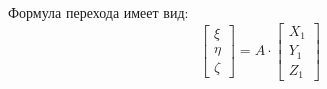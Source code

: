 Формула перехода имеет вид:
\begin{equation}
	\begin{bmatrix}
		\xi \\
		\eta \\
		\zeta
	\end{bmatrix} = A \cdot \begin{bmatrix}	X_1 \\ Y_1 \\ Z_1 \end{bmatrix}
\end{equation}
\clearpage